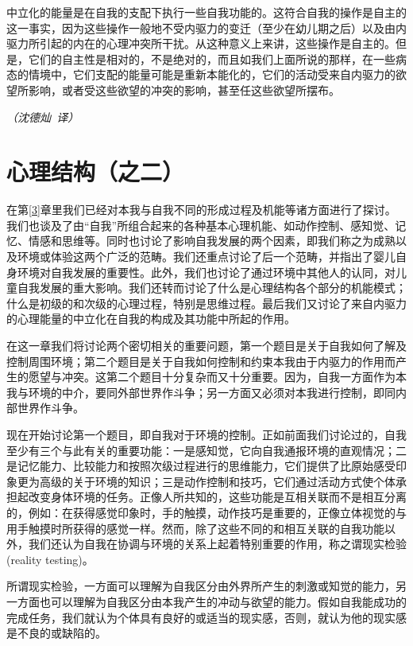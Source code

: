 \documentclass[UTF8,10pt,a4paper,openany]{book}
\newcommand{\signature}[1]{\begin{flushright}\slshape #1\end{flushright}}
\newcommand{\signatureB}{\signature{（沈德灿~译）}}
\begin{document}
中立化的能量是在自我的支配下执行一些自我功能的。这符合自我的操作是自主的这一事实，因为这些操作一般地不受内驱力的变迁（至少在幼儿期之后）以及由内驱力所引起的内在的心理冲突所干扰。从这种意义上来讲，这些操作是自主的。但是，它们的自主性是相对的，不是绝对的，而且如我们上面所说的那样，在一些病态的情境中，它们支配的能量可能是重新本能化的，它们的活动受来自内驱力的欲望所影响，或者受这些欲望的冲突的影响，甚至任这些欲望所摆布。

\signatureB



\chapter{心理结构（之二）}\label{4}

在第\ref{3}章里我们已经对本我与自我不同的形成过程及机能等诸方面进行了探讨。我们也谈及了由“自我”所组合起来的各种基本心理机能、如动作控制、感知觉、记忆、情感和思维等。同时也讨论了影响自我发展的两个因素，即我们称之为成熟以及环境或体验这两个广泛的范畴。我们还重点讨论了后一个范畴，并指出了婴儿自身环境对自我发展的重要性。此外，我们也讨论了通过环境中其他人的认同，对儿童自我发展的重大影响。我们还转而讨论了什么是心理结构各个部分的机能模式；什么是初级的和次级的心理过程，特别是思维过程。最后我们又讨论了来自内驱力的心理能量的中立化在自我的构成及其功能中所起的作用。

在这一章我们将讨论两个密切相关的重要问题，第一个题目是关于自我如何了解及控制周围环境；第二个题目是关于自我如何控制和约束本我由于内驱力的作用而产生的愿望与冲突。这第二个题目十分复杂而又十分重要。因为，自我一方面作为本我与环境的中介，要同外部世界作斗争；另一方面又必须对本我进行控制，即同内部世界作斗争。

现在开始讨论第一个题目，即自我对于环境的控制。正如前面我们讨论过的，自我至少有三个与此有关的重要功能：一是感知觉，它向自我通报环境的直观情况；二是记忆能力、比较能力和按照次级过程进行的思维能力，它们提供了比原始感受印象更为高级的关于环境的知识；三是动作控制和技巧，它们通过活动方式使个体承担起改变身体环境的任务。正像人所共知的，这些功能是互相关联而不是相互分离的，例如：在获得感觉印象时，手的触摸，动作技巧是重要的，正像立体视觉的与用手触摸时所获得的感觉一样。然而，除了这些不同的和相互关联的自我功能以外，我们还认为自我在协调与环境的关系上起着特别重要的作用，称之谓现实检验(reality testing)。

所谓现实检验，一方面可以理解为自我区分由外界所产生的刺激或知觉的能力，另一方面也可以理解为自我区分由本我产生的冲动与欲望的能力。假如自我能成功的完成任务，我们就认为个体具有良好的或适当的现实感，否则，就认为他的现实感是不良的或缺陷的。
\end{document}
